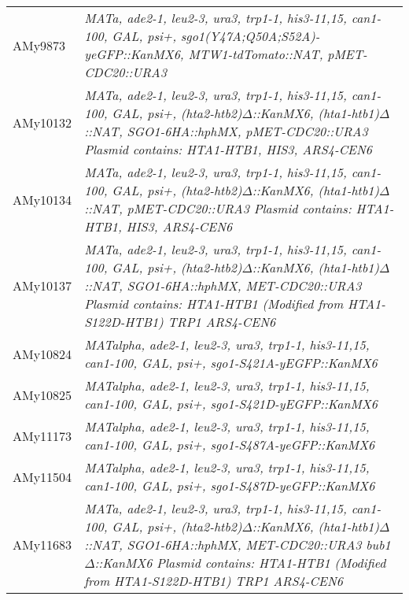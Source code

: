 \begin{longtable}{p{}p{}}
AMy9873         & \textit{MATa, ade2-1, leu2-3, ura3,   trp1-1, his3-11,15, can1-100, GAL, psi+, sgo1(Y47A;Q50A;S52A)-yeGFP::KanMX6,   MTW1-tdTomato::NAT, pMET-CDC20::URA3}                                                                                             \\
AMy10132        & \textit{MATa, ade2-1, leu2-3, ura3,   trp1-1, his3-11,15, can1-100, GAL, psi+, (hta2-htb2)$\Delta$::KanMX6,   (hta1-htb1)$\Delta$::NAT, SGO1-6HA::hphMX, pMET-CDC20::URA3 Plasmid contains:   HTA1-HTB1, HIS3, ARS4-CEN6}                                            \\
AMy10134        & \textit{MATa, ade2-1, leu2-3, ura3,   trp1-1, his3-11,15, can1-100, GAL, psi+, (hta2-htb2)$\Delta$::KanMX6,   (hta1-htb1)$\Delta$::NAT, pMET-CDC20::URA3 Plasmid contains: HTA1-HTB1, HIS3,   ARS4-CEN6}                                                             \\
AMy10137        & \textit{MATa, ade2-1, leu2-3, ura3,   trp1-1, his3-11,15, can1-100, GAL, psi+, (hta2-htb2)$\Delta$::KanMX6,   (hta1-htb1)$\Delta$::NAT, SGO1-6HA::hphMX, MET-CDC20::URA3 Plasmid contains:   HTA1-HTB1 (Modified from HTA1-S122D-HTB1) TRP1 ARS4-CEN6}               \\
AMy10824        & \textit{MATalpha, ade2-1, leu2-3, ura3,   trp1-1, his3-11,15, can1-100, GAL, psi+, sgo1-S421A-yEGFP::KanMX6}                                                                                                                                           \\
AMy10825        & \textit{MATalpha, ade2-1, leu2-3, ura3,   trp1-1, his3-11,15, can1-100, GAL, psi+, sgo1-S421D-yEGFP::KanMX6}                                                                                                                                           \\
AMy11173        & \textit{MATalpha, ade2-1, leu2-3, ura3,   trp1-1, his3-11,15, can1-100, GAL, psi+, sgo1-S487A-yeGFP::KanMX6}                                                                                                                                           \\
AMy11504        & \textit{MATalpha, ade2-1, leu2-3, ura3,   trp1-1, his3-11,15, can1-100, GAL, psi+, sgo1-S487D-yeGFP::KanMX6}                                                                                                                                           \\
AMy11683        & \textit{MATa, ade2-1, leu2-3, ura3,   trp1-1, his3-11,15, can1-100, GAL, psi+, (hta2-htb2)$\Delta$::KanMX6,   (hta1-htb1)$\Delta$::NAT, SGO1-6HA::hphMX, MET-CDC20::URA3 bub1$\Delta$::KanMX6 Plasmid   contains: HTA1-HTB1 (Modified from HTA1-S122D-HTB1) TRP1 ARS4-CEN6} \\

\end{longtable}
